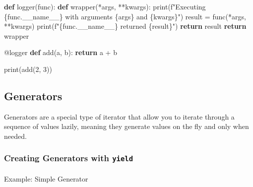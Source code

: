 \documentclass[
  letterpaper,
  DIV=11,
  numbers=noendperiod]{scrreprt}
\makeatletter
\let\oldparagraph\paragraph
\renewcommand{\paragraph}{
    \@ifstar
      \xxxParagraphStar
      \xxxParagraphNoStar
  }
\newcommand{\xxxParagraphStar}[1]{\oldparagraph*{#1}\mbox{}}
\newcommand{\xxxParagraphNoStar}[1]{\oldparagraph{#1}\mbox{}}
\newenvironment{Shaded}{\begin{snugshade}}{\end{snugshade}}
\newcommand{\AttributeTok}[1]{\textcolor[rgb]{0.40,0.45,0.13}{#1}}
\newcommand{\BuiltInTok}[1]{\textcolor[rgb]{0.00,0.23,0.31}{#1}}
\newcommand{\ControlFlowTok}[1]{\textcolor[rgb]{0.00,0.23,0.31}{\textbf{#1}}}
\newcommand{\DecValTok}[1]{\textcolor[rgb]{0.68,0.00,0.00}{#1}}
\newcommand{\KeywordTok}[1]{\textcolor[rgb]{0.00,0.23,0.31}{\textbf{#1}}}
\newcommand{\NormalTok}[1]{\textcolor[rgb]{0.00,0.23,0.31}{#1}}
\newcommand{\OperatorTok}[1]{\textcolor[rgb]{0.37,0.37,0.37}{#1}}
\newcommand{\SpecialCharTok}[1]{\textcolor[rgb]{0.37,0.37,0.37}{#1}}
\newcommand{\SpecialStringTok}[1]{\textcolor[rgb]{0.13,0.47,0.30}{#1}}
\newcommand{\VariableTok}[1]{\textcolor[rgb]{0.07,0.07,0.07}{#1}}
\makeatother
\begin{document}
\begin{Shaded}
\begin{Highlighting}[]
\KeywordTok{def}\NormalTok{ logger(func):}
    \KeywordTok{def}\NormalTok{ wrapper(}\OperatorTok{*}\NormalTok{args, }\OperatorTok{**}\NormalTok{kwargs):}
        \BuiltInTok{print}\NormalTok{(}\SpecialStringTok{f"Executing }\SpecialCharTok{\{}\NormalTok{func}\SpecialCharTok{.}\VariableTok{\_\_name\_\_}\SpecialCharTok{\}}\SpecialStringTok{ with arguments }\SpecialCharTok{\{}\NormalTok{args}\SpecialCharTok{\}}\SpecialStringTok{ and }\SpecialCharTok{\{}\NormalTok{kwargs}\SpecialCharTok{\}}\SpecialStringTok{"}\NormalTok{)}
\NormalTok{        result }\OperatorTok{=}\NormalTok{ func(}\OperatorTok{*}\NormalTok{args, }\OperatorTok{**}\NormalTok{kwargs)}
        \BuiltInTok{print}\NormalTok{(}\SpecialStringTok{f"}\SpecialCharTok{\{}\NormalTok{func}\SpecialCharTok{.}\VariableTok{\_\_name\_\_}\SpecialCharTok{\}}\SpecialStringTok{ returned }\SpecialCharTok{\{}\NormalTok{result}\SpecialCharTok{\}}\SpecialStringTok{"}\NormalTok{)}
        \ControlFlowTok{return}\NormalTok{ result}
    \ControlFlowTok{return}\NormalTok{ wrapper}

\AttributeTok{@logger}
\KeywordTok{def}\NormalTok{ add(a, b):}
    \ControlFlowTok{return}\NormalTok{ a }\OperatorTok{+}\NormalTok{ b}

\BuiltInTok{print}\NormalTok{(add(}\DecValTok{2}\NormalTok{, }\DecValTok{3}\NormalTok{))}
\end{Highlighting}
\end{Shaded}

\subsection{Generators}\label{generators}

Generators are a special type of iterator that allow you to iterate
through a sequence of values lazily, meaning they generate values on the
fly and only when needed.

\subsubsection{\texorpdfstring{Creating Generators with
\texttt{yield}}{Creating Generators with yield}}\label{creating-generators-with-yield}

\paragraph{Example: Simple Generator}\label{example-simple-generator}
\end{document}
